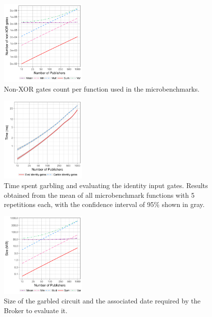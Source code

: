 \begin{figure}
  \includegraphics[width=0.38\textwidth]{plots/nonxor_gates_log.png}
  \caption{Non-XOR gates count per function used in the microbenchmarks.}
  \label{micro-nonxor}
\end{figure}

\begin{figure}
  \includegraphics[width=0.38\textwidth]{plots/enc_dec.png}
  \caption{Time spent garbling and evaluating the identity input gates.
    Results obtained from the mean of all microbenchmark functions with 5
    repetitions each, with the confidence interval of 95\% shown in gray.}
  \label{micro-inputs}
\end{figure}

\begin{figure}
  \includegraphics[width=0.38\textwidth]{plots/size_log.png}
  \caption{Size of the garbled circuit and the associated date required by the
    Broker to evaluate it.}
  \label{micro-sizes}
\end{figure}

